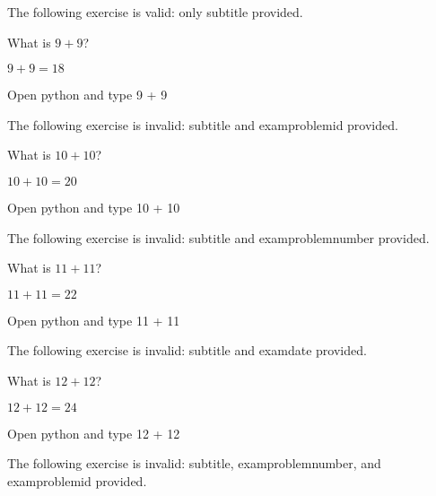 \documentclass[oneside]{book}
\begin{document}
The following exercise is valid: only subtitle provided.

\begin{exercise}[subtitle={Simple Addition}]
  What is \(9 + 9\)?
\end{exercise}
\begin{solution}
  \(9 + 9 = 18\)
\end{solution}
\begin{additionalinformation}
Open python and type 9 + 9
\end{additionalinformation}

The following exercise is invalid: subtitle and examproblemid provided.

\begin{exercise}[subtitle={Simple Addition}, examproblemid={2020-01-15-10}]
  What is \(10 + 10\)?
\end{exercise}
\begin{solution}
  \(10 + 10 = 20\)
\end{solution}
\begin{additionalinformation}
Open python and type 10 + 10
\end{additionalinformation}

The following exercise is invalid: subtitle and examproblemnumber provided.

\begin{exercise}[subtitle={Simple Addition}, examproblemnumber={11}]
  What is \(11 + 11\)?
\end{exercise}
\begin{solution}
  \(11 + 11 = 22\)
\end{solution}
\begin{additionalinformation}
Open python and type 11 + 11
\end{additionalinformation}

The following exercise is invalid: subtitle and examdate provided.

\begin{exercise}[subtitle={Simple Addition}, examdate={January 15, 2020}]
  What is \(12 + 12\)?
\end{exercise}
\begin{solution}
  \(12 + 12 = 24\)
\end{solution}
\begin{additionalinformation}
Open python and type 12 + 12
\end{additionalinformation}

The following exercise is invalid: subtitle, examproblemnumber, and examproblemid provided.
\end{document}
